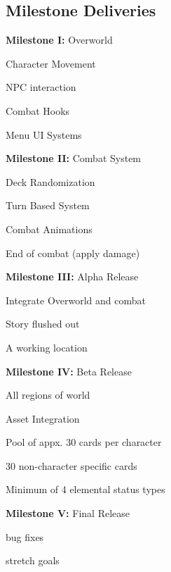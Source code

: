 \documentclass[12pt,titlepage]{article}
\begin{document}
\subsection{Milestone Deliveries}
    \begin{todolist}
        \item \textbf{Milestone I:} Overworld
            \begin{todolist}
                \item Character Movement
                \item NPC interaction
                \item Combat Hooks
                \item Menu UI Systems
            \end{todolist}
        \item \textbf{Milestone II:} Combat System
            \begin{todolist}
                \item Deck Randomization
                \item Turn Based System
                \item Combat Animations
                \item End of combat (apply damage)
            \end{todolist}    
        \item \textbf{Milestone III:} Alpha Release
            \begin{todolist}
                \item Integrate Overworld and combat
                \item Story flushed out
                \item A working location
            \end{todolist}
        \item \textbf{Milestone IV:} Beta Release
            \begin{todolist}
                \item All regions of world
                \item Asset Integration
                \item Pool of appx. 30 cards per character
                \item 30 non-character specific cards
                \item Minimum of 4 elemental status types
            \end{todolist}
        \item \textbf{Milestone V:} Final Release
            \begin{todolist}
                \item bug fixes
                \item stretch goals
            \end{todolist}
    \end{todolist}
\end{document}
